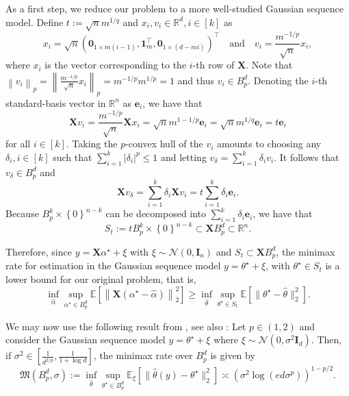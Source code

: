 \documentclass[a4paper]{article}
\newcommand{\mathset}[1]{\left\{#1\right\}}
\newcommand{\br}[1]{\left[#1\right]}
\newcommand{\abs}[1]{\left\lvert#1\right\rvert}
\newcommand{\norm}[1]{\left\|#1\right\|}
\newcommand{\I}[0]{\mathbf{I}}
\newcommand{\X}[0]{\mathbf{X}}
\newcommand{\e}[0]{\mathbf{e}}
\newcommand{\zeros}[0]{\mathbf{0}}
\newcommand{\EE}[0]{\mathbb{E}}
\newcommand{\RR}[0]{\mathbb{R}}
\newcommand{\cN}[0]{\mathcal{N}}
\newcommand{\ha}[0]{\widehat{\alpha}}
\newcommand{\alphastar}{\alpha^\star}
\newcommand{\ind}[0]{\mathbf{1}}
\theoremstyle{thmstyle}
\theoremstyle{defstyle}
\theoremstyle{remark}
\begin{document}
As a first step, we reduce our problem to a more well-studied Gaussian sequence model.
Define $t:=\sqrt{n}m^{1/q}$ and $x_i, v_i\in \RR^d,i\in[k]$ as 
\begin{equation*}
    x_i=\sqrt{n}(\zeros_{1\times m(i-1)},\ind_m^\top,\zeros_{1\times (d-mi)})^\top \quad \text{and} \quad v_i=\frac{m^{-1/p}}{\sqrt{n}} x_i,
\end{equation*}
where $x_i$ is the vector corresponding to the $i$-th row of $\X$. Note that $\norm{v_i}_p=\norm{ \frac{m^{-1/p}}{\sqrt{n}} x_i }_p= m^{-1/p} m^{1/p}=1$ and thus $v_i\in  B_p^d$.
Denoting the $i$-th standard-basis vector in $\RR^n$ as $\e_i$, we have that
\begin{equation*}
    \X v_i = \frac{m^{-1/p}}{\sqrt{n}} \X x_i =  \sqrt{n} m^{1-1/p}  \e_i = \sqrt{n} m^{1/q}\e_i = t\e_i
\end{equation*}
for all $i\in[k]$. Taking the $p$-convex hull of the $v_i$ amounts to choosing any $\delta_i,i\in[k]$ such that $\sum_{i=1}^k\abs{\delta_i}^p\leq1$ and letting $v_\delta = \sum_{i=1}^k\delta_i v_i$. It follows that $v_\delta\in B_p^d$ and
\begin{equation*}
    \X v_\delta = \sum_{i=1}^k\delta_i \X v_i = t \sum_{i=1}^k\delta_i \e_i.
\end{equation*}
Because $B_p^k\times \mathset{0}^{n-k}$ can be decomposed into $\sum_{i=1}^k\delta_i\e_i$, we have that
\begin{equation*}    
  S_t:=tB^k_p\times \mathset{0}^{n-k} \subset \X B^d_p\subset \RR^n.
\end{equation*}

Therefore, since $y=\X\alphastar+\xi$ with $\xi\sim \cN(0,\I_n)$ and $S_t\subset \X B_p^d$, the minimax rate for estimation in the Gaussian sequence model $y=\theta^\star+\xi$, with $\theta^\star\in S_t$ is a lower bound for our original problem, that is,
\begin{equation}
\label{eq:reduction-Gaussian-sequence}
    \inf_{\ha}\sup_{\alphastar\in  B_p^d}\EE\br{\norm{\X(\alphastar-\ha)}_2^2}\geq \inf_{\widehat \theta}\sup_{\theta^\star\in S_t}\EE\br{\|\theta^\star-\widehat \theta\|_2^2}.
\end{equation}

We may now use the following result from \citet[Theorem 11.7]{johnstone2017gaussian}, see also \citet[page 6]{aolaritei2025revisiting}:
Let $p\in(1,2)$ and consider the Gaussian sequence model $y = \theta^\star+\xi$ where $\xi\sim \cN(0,\sigma^2 \I_d)$. Then, if $\sigma^2 \in [\frac{1}{d^{2/p}}, \frac{1}{1+\log d}]$, the minimax rate over $B_p^d$ is given by
\begin{equation*}
    \mathfrak{M}(B_p^d,\sigma) := \inf_{\widehat\theta} \sup_{\theta^\star\in B_p^d} \EE_\xi\br{\|\widehat\theta(y)-\theta^\star\|_2^2} \asymp (\sigma^2 \log(e d \sigma^p))^{1-p/2}.
\end{equation*}
\end{document}
